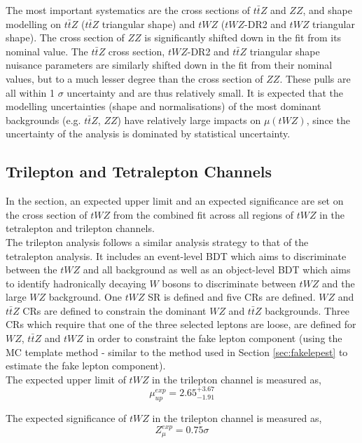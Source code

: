 The most important systematics are the cross sections of $t\bar{t}Z$ and $ZZ$, and shape modelling on $t\bar{t}Z$ ($t\bar{t}Z$ triangular shape) and $tWZ$ ($tWZ$-DR2 and $tWZ$ triangular shape). The cross section of $ZZ$ is significantly shifted down in the fit from its nominal value. The $t\bar{t}Z$ cross section, $tWZ$-DR2 and $t\bar{t}Z$ triangular shape nuisance parameters are similarly shifted down in the fit from their nominal values, but to a much lesser degree than the cross section of $ZZ$. These pulls are all within 1 $\sigma$ uncertainty and are thus relatively small. It is expected that the modelling uncertainties (shape and normalisations) of the most dominant backgrounds (e.g. $t\bar{t}Z$, $ZZ$) have relatively large impacts on $\mu(tWZ)$, since the uncertainty of the analysis is dominated by statistical uncertainty.

\subsection{Trilepton and Tetralepton Channels}
\label{sec:combined-results}
In the section, an expected upper limit and an expected significance are set on the cross section of $tWZ$ from the combined fit across all regions of $tWZ$ in the tetralepton and trilepton channels.\\

The trilepton analysis follows a similar analysis strategy to that of the tetralepton analysis. It includes an event-level BDT which aims to discriminate between the $tWZ$ and all background as well as an object-level BDT which aims to identify hadronically decaying $W$ bosons to discriminate between $tWZ$ and the large $WZ$ background. One $tWZ$ SR is defined and five CRs are defined. $WZ$ and $t\bar{t}Z$ CRs are defined to constrain the dominant $WZ$ and $t\bar{t}Z$ backgrounds. Three CRs which require that one of the three selected leptons are loose, are defined for $WZ$, $t\bar{t}Z$ and $tWZ$ in order to constraint the fake lepton component (using the MC template method - similar to the method used in Section \ref{sec:fakelepest} to estimate the fake lepton component).\\

The expected upper limit of $tWZ$ in the trilepton channel is measured as,
\begin{equation}
  \mu_{up}^{exp} =   2.65^{+3.67}_{-1.91}
\end{equation}

The expected significance of $tWZ$ in the trilepton channel is measured as,
\begin{equation}
 Z_{\mu}^{exp} =   0.75\sigma
\end{equation}


